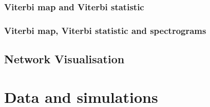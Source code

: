 \subsubsection{Viterbi map and Viterbi statistic}

\subsubsection{Viterbi map, Viterbi statistic and spectrograms}

\subsection{Network Visualisation}


\section{Data and simulations}